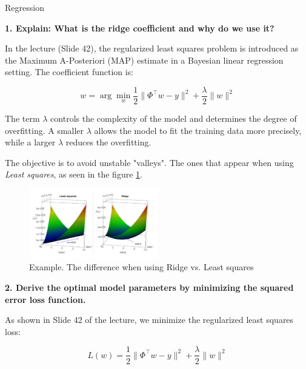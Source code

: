 \documentclass[
	english,
        solution=true
	]{tudaexercise}
\begin{document}
\begin{task}[points=34]{Regression}
\begin{subtask}[points=8, title=Linear Features]
        \begin{solution}
            \textbf{1. Explain: What is the ridge coefficient and why do we use it?}

            In the lecture (Slide 42), the regularized least squares problem is introduced as the Maximum A-Posteriori (MAP) estimate in a Bayesian linear regression setting.
            The coefficient function is:

            \[
            w = \arg\min_w \frac{1}{2} \|\Phi^\top w - y\|^2 + \frac{\lambda}{2} \|w\|^2
            \]


            The term $\lambda$ controls the complexity of the model and determines the degree of overfitting.
            A smaller $\lambda$ allows the model to fit the training data more precisely, while a larger $\lambda$ reduces the overfitting.

            The objective is to avoid unstable "valleys".
            The ones that appear when using \textit{Least squares}, as seen in the figure \ref{Task1a_1}.

            \begin{figure}[H]
                \centering
                \includegraphics[width=0.5\textwidth]{images/Task1a_1.png}
                \caption{Example. The difference when using Ridge vs. Least squares}
                \label{Task1a_1}
            \end{figure}
            
            \vspace{2em}

            \textbf{2. Derive the optimal model parameters by minimizing the squared error loss function.}

            As shown in Slide 42 of the lecture, we minimize the regularized least squares loss:

            \[
            L(w) = \frac{1}{2} \|\Phi^\top w - y\|^2 + \frac{\lambda}{2} \|w\|^2
            \]


\end{solution}
\end{subtask}
\end{task}
\end{document}
